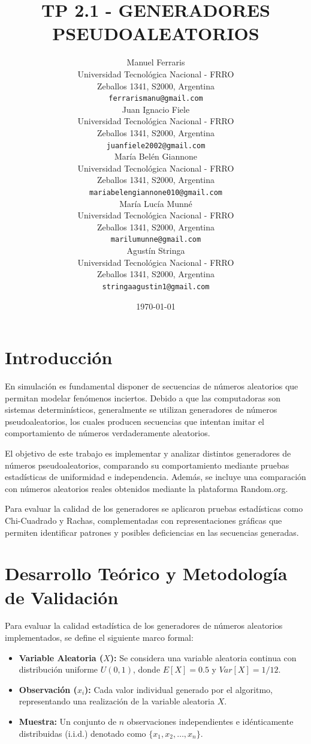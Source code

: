 \documentclass{article}
\title{TP 2.1 - GENERADORES PSEUDOALEATORIOS}
\author{
  Manuel Ferraris \\
  Universidad Tecnológica Nacional - FRRO \\
  Zeballos 1341, S2000, Argentina \\
  \texttt{ferrarismanu@gmail.com} \\
  \And
  Juan Ignacio Fiele \\
  Universidad Tecnológica Nacional - FRRO \\
  Zeballos 1341, S2000, Argentina \\
  \texttt{juanfiele2002@gmail.com} \\
  \And
  María Belén Giannone \\
  Universidad Tecnológica Nacional - FRRO \\
  Zeballos 1341, S2000, Argentina \\
  \texttt{mariabelengiannone010@gmail.com} \\
  \And
  María Lucía Munné \\
  Universidad Tecnológica Nacional - FRRO \\
  Zeballos 1341, S2000, Argentina \\
  \texttt{marilumunne@gmail.com} \\
  \And
  Agustín Stringa \\
  Universidad Tecnológica Nacional - FRRO \\
  Zeballos 1341, S2000, Argentina \\
  \texttt{stringaagustin1@gmail.com} \\
}
\date{\today}
\begin{document}
\maketitle


\begin{abstract}
\end{abstract}

\section{Introducción}
En simulación es fundamental disponer de secuencias de números aleatorios que permitan modelar fenómenos inciertos. Debido a que las computadoras son sistemas determinísticos, generalmente se utilizan generadores de números pseudoaleatorios, los cuales producen secuencias que intentan imitar el comportamiento de números verdaderamente aleatorios.

El objetivo de este trabajo es implementar y analizar distintos generadores de números pseudoaleatorios, comparando su comportamiento mediante pruebas estadísticas de uniformidad e independencia. Además, se incluye una comparación con números aleatorios reales obtenidos mediante la plataforma Random.org.

Para evaluar la calidad de los generadores se aplicaron pruebas estadísticas como Chi-Cuadrado y Rachas, complementadas con representaciones gráficas que permiten identificar patrones y posibles deficiencias en las secuencias generadas.



\section{Desarrollo Teórico y Metodología de Validación}

Para evaluar la calidad estadística de los generadores de números aleatorios implementados, se define el siguiente marco formal:

\begin{itemize}
  \item \textbf{Variable Aleatoria ($X$):} Se considera una variable aleatoria continua con distribución uniforme $U(0, 1)$, donde $E[X] = 0.5$ y $Var[X] = 1/12$.
  \item \textbf{Observación ($x_i$):} Cada valor individual generado por el algoritmo, representando una realización de la variable aleatoria $X$.
  \item \textbf{Muestra:} Un conjunto de $n$ observaciones independientes e idénticamente distribuidas (i.i.d.) denotado como $\{x_1, x_2, \dots, x_n\}$.
\end{itemize}
\end{document}
